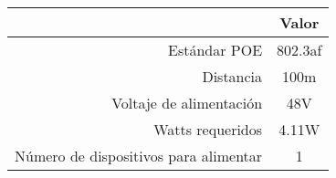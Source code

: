 \begin{tabular}{|r|c|}
  \hline
  \rowcolor[HTML]{E3FFE3} \multicolumn{1}{|c|}{Parámetro} & Valor \\
  \hline
  Estándar POE & 802.3af \\
  \hline
  Distancia & 100m \\
  \hline
  Voltaje de alimentación & 48V \\
  \hline
  Watts requeridos & 4.11W \\
  \hline
  Número de dispositivos para alimentar & 1 \\
  \hline
\end{tabular}